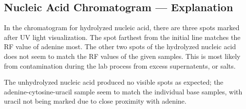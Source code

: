     \subsection*{Nucleic Acid Chromatogram --- Explanation}
    In the chromatogram for hydrolyzed nucleic acid, there are three spots marked after UV light visualization. The spot farthest from the initial line matches the RF value of adenine most. The other two spots of the hydrolyzed nucleic acid does not seem to match the RF values of the given samples. This is most likely from contamination during the lab process from excess supernatents, or salts. \par
    The unhydrolyzed nucleic acid produced no visible spots as expected; the adenine-cytosine-uracil sample seem to match the individual base samples, with uracil not being marked due to close proximity with adenine.